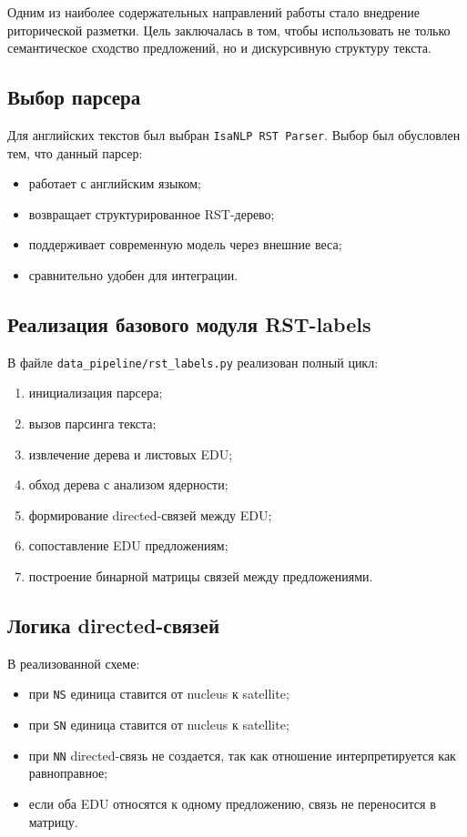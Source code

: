 \documentclass[12pt,a4paper]{article}
\begin{document}
Одним из наиболее содержательных направлений работы стало внедрение риторической
разметки. Цель заключалась в том, чтобы использовать не только семантическое сходство
предложений, но и дискурсивную структуру текста.

\subsection{Выбор парсера}

Для английских текстов был выбран \texttt{IsaNLP RST Parser}. Выбор был обусловлен тем,
что данный парсер:

\begin{itemize}
    \item работает с английским языком;
    \item возвращает структурированное RST-дерево;
    \item поддерживает современную модель через внешние веса;
    \item сравнительно удобен для интеграции.
\end{itemize}

\subsection{Реализация базового модуля RST-labels}

В файле \texttt{data\_pipeline/rst\_labels.py} реализован полный цикл:

\begin{enumerate}
    \item инициализация парсера;
    \item вызов парсинга текста;
    \item извлечение дерева и листовых EDU;
    \item обход дерева с анализом ядерности;
    \item формирование directed-связей между EDU;
    \item сопоставление EDU предложениям;
    \item построение бинарной матрицы связей между предложениями.
\end{enumerate}

\subsection{Логика directed-связей}

В реализованной схеме:

\begin{itemize}
    \item при \texttt{NS} единица ставится от nucleus к satellite;
    \item при \texttt{SN} единица ставится от nucleus к satellite;
    \item при \texttt{NN} directed-связь не создается, так как отношение интерпретируется
    как равноправное;
    \item если оба EDU относятся к одному предложению, связь не переносится в матрицу.
\end{itemize}
\end{document}
